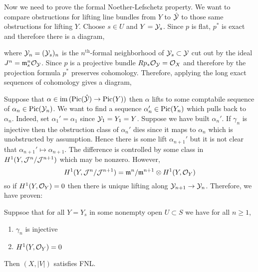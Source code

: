 \documentclass[12pt]{article}
\begin{document}
Now we need to prove the formal Noether-Lefschetz property. We want to compare obstructions for lifting line bundles from $Y$ to $\hat{\mathcal{Y}}$ to those same obstructions for lifting $Y$.
Choose $s \in U$ and $Y = \mathcal{Y}_s$. Since $p$ is flat, $p^*$ is exact and therefore there is a diagram,
\begin{center}
\end{center}
where $\mathcal{Y}_{n} = (\mathcal{Y}_s)_n$ is the $n^{\text{th}}$-formal neighborhood of $\mathcal{Y}_s \subset \mathcal{Y}$ cut out by the ideal $J^n = \mathfrak{m}_s^n \mathcal{O}_{\mathcal{Y}}$. Since $p$ is a projective bundle $R p_* \mathcal{O}_{\mathcal{Y}} = \mathcal{O}_{X}$ and therefore by the projection formula $p^*$ preserves cohomology. Therefore, applying the long exact sequences of cohomology gives a diagram,
\begin{center}
\end{center}
Suppose that $\alpha \in \operatorname{\mathrm{im}}{(\mathrm{Pic}(\hat{\mathcal{Y}}) \to \mathrm{Pic}(Y))}$ then $\alpha$ lifts to some comptabile sequence of $\alpha_n \in \mathrm{Pic}(\mathcal{Y}_{n})$. We want to find a sequence $\alpha_n' \in \mathrm{Pic}(Y_n)$ which pulls back to $\alpha_n$. Indeed, set $\alpha_1' = \alpha_1$ since $\mathcal{Y}_1 = Y_1 = Y$. Suppose we have built $\alpha_n'$. If $\gamma_n$ is injective then the obstruction class of $\alpha_n'$ dies since it maps to $\alpha_n$ which is unobstructed by assumption. Hence there is some lift $\alpha_{n+1}'$ but it is not clear that $\alpha_{n+1}' \mapsto \alpha_{n+1}$. The difference is controlled by some class in $H^1(Y, \mathcal{J}^n / \mathcal{J}^{n+1})$ which may be nonzero. However,
\[ H^1(Y, \mathcal{J}^n / \mathcal{J}^{n+1}) = \mathfrak{m}^n / \mathfrak{m}^{n+1} \otimes H^1(Y, \mathcal{O}_{Y}) \]
so if $H^1(Y, \mathcal{O}_{Y}) = 0$ then there is unique lifting along $\mathcal{Y}_{n+1} \to \mathcal{Y}_n$.
Therefore, we have proven:

\begin{lemma}
Suppsoe that for all $Y = Y_s$ in some nonempty open $U \subset S$ we have for all $n \ge 1$,
\begin{enumerate}
\item $\gamma_n$ is injective
\item $H^1(Y, \mathcal{O}_{Y}) = 0$
\end{enumerate} 
Then $(X, |V|)$ satisfies FNL.
\end{lemma}
\end{document}
